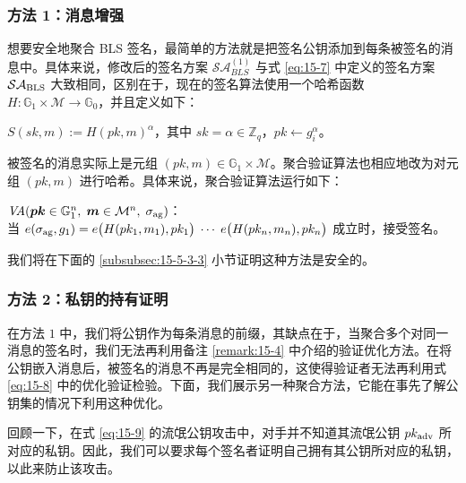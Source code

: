 \subsubsection{方法 1：消息增强}\label{subsubsec:15-5-3-1}

想要安全地聚合 BLS 签名，最简单的方法就是把签名公钥添加到每条被签名的消息中。具体来说，修改后的签名方案 $\mathcal{SA}_{BLS}^{(1)}$ 与式 \ref{eq:15-7} 中定义的签名方案 $\mathcal{SA}_{\rm BLS}$ 大致相同，区别在于，现在的签名算法使用一个哈希函数 $H:\mathbb{G}_1\times\mathcal{M}\to\mathbb{G}_0$，并且定义如下：

\vspace*{10pt}

\hspace*{10pt} $S(sk,m):=H(pk,m)^\alpha$，其中 $sk=\alpha \in \mathbb{Z}_q$，$pk \leftarrow g_i^\alpha$。

\vspace*{10pt}

\noindent
被签名的消息实际上是元组 $(pk,m)\in\mathbb{G}_1\times\mathcal{M}$。聚合验证算法也相应地改为对元组 $(pk,m)$ 进行哈希。具体来说，聚合验证算法运行如下：

\vspace*{10pt}

\hspace*{9pt} $\textit{VA}(\boldsymbol{pk}\in\mathbb{G}_1^n,\;\boldsymbol{m}\in\mathcal{M}^n,\;\sigma_{\rm ag})$：\\
\hspace*{70pt} 当 $e(\sigma_{\rm ag},g_1)=e\big(H(pk_1,m_1),pk_1\big)\;\cdots\; e\big(H(pk_n,m_n),pk_n\big)$ 成立时，接受签名。

\vspace*{10pt}

\noindent
我们将在下面的 \ref{subsubsec:15-5-3-3} 小节证明这种方法是安全的。

\subsubsection{方法 2：私钥的持有证明}\label{subsubsec:15-5-3-2}

在方法 $1$ 中，我们将公钥作为每条消息的前缀，其缺点在于，当聚合多个对同一消息的签名时，我们无法再利用备注 \ref{remark:15-4} 中介绍的验证优化方法。在将公钥嵌入消息后，被签名的消息不再是完全相同的，这使得验证者无法再利用式 \ref{eq:15-8} 中的优化验证检验。下面，我们展示另一种聚合方法，它能在事先了解公钥集的情况下利用这种优化。

回顾一下，在式 \ref{eq:15-9} 的流氓公钥攻击中，对手并不知道其流氓公钥 $pk_{\rm adv}$ 所对应的私钥。因此，我们可以要求每个签名者证明自己拥有其公钥所对应的私钥，以此来防止该攻击。

